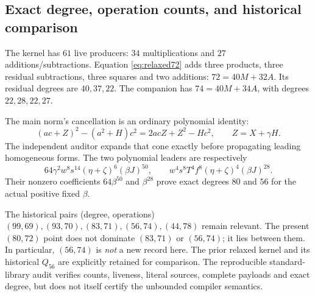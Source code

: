 \subsection{Exact degree, operation counts, and historical comparison}
The kernel has $61$ live producers: $34$ multiplications and $27$
additions/subtractions. Equation \eqref{eq:relaxed72} adds three products,
three residual subtractions, three squares and two additions:
$72=40M+32A$. Its residual degrees are $40,37,22$.
The companion has $74=40M+34A$, with degrees $22,28,22,27$.

The main norm's cancellation is an ordinary polynomial identity:
\[
 (ac+Z)^2-(a^2+H)c^2=2acZ+Z^2-Hc^2,\qquad Z=X+\gamma H.
\]
The independent auditor expands that cone exactly before propagating
leading homogeneous forms. The two polynomial leaders are respectively
\[
 64\gamma^2w^8s^{14}(\eta+\zeta)^6(\beta J)^{50},\qquad
 w^4s^8T^4f^8(\eta+\zeta)^4(\beta J)^{28}.
\]
Their nonzero coefficients $64\beta^{50}$ and $\beta^{28}$ prove exact
degrees $80$ and $56$ for the actual positive fixed $\beta$.

The historical pairs (degree, operations) $ (99,69),(93,70),(83,71),
(56,74),(44,78)$ remain relevant. The present $(80,72)$ point does not
dominate $(83,71)$ or $(56,74)$; it lies between them. In particular,
$(56,74)$ is \emph{not} a new record here. The prior relaxed kernel and
its historical $Q_{56}$ are explicitly retained for comparison.
The reproducible standard-library audit verifies counts, liveness,
literal sources, complete payloads and exact degree, but does not itself
certify the unbounded compiler semantics.

